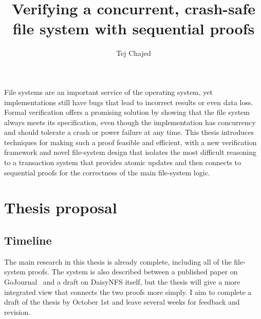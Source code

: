 \documentclass[fontsize=12pt,paper=letter,cleardoublepage=plain,twoside=false]{scrbook}
\title{Verifying a concurrent, crash-safe file system with sequential proofs}
\author{Tej Chajed}
\begin{document}
\mainmatter

File systems are an important service of the operating system, yet
implementations still have bugs that lead to incorrect results or even data loss. Formal
verification offers a promising solution by showing that the file system always
meets its specification, even though the implementation has concurrency and
should tolerate a crash or power failure at any time. This thesis introduces
techniques for making such a proof feasible and efficient, with a new
verification framework and novel file-system design that isolates the most
difficult reasoning to a transaction system that provides atomic updates and
then connects to sequential proofs for the correctness of the main file-system
logic.

%


\chapter{Thesis proposal}


\section{Timeline}
The main research in this thesis is already complete, including all of the
file-system proofs. The system is also described between a published paper on
GoJournal~\cite{chajed:gojournal} and a draft on DaisyNFS itself, but the thesis
will give a more integrated view that connects the two proofs more simply. I aim
to complete a draft of the thesis by October 1st and leave several weeks for
feedback and revision.

\backmatter

\begin{spacing}{1}
{}

\end{spacing}
\end{document}
